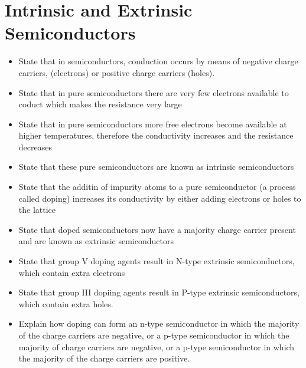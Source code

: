 \section{Intrinsic and Extrinsic Semiconductors}
\begin{multicols}{2}
	\begin{itemize}
        \item State that in semiconductors, conduction occurs by means of 
            negative charge carriers, (electrons) or positive charge carriers 
            (holes).
        \item State that in pure semiconductors there are very few electrons
            available to coduct which makes the resistance very large
        \item State that in pure semiconductors more free electrons become
            available at higher temperatures, therefore the conductivity
            increases and the resistance decreases
        \item State that these pure semiconductors are known as intrinsic
            semiconductors
        \item State that the additin of impurity atoms to a pure semiconductor
            (a process called doping) increases its conductivity by either
            adding electrons or holes to the lattice
        \item State that doped semiconductors now have a majority charge
            carrier present and are known as extrinsic semiconductors
        \item State that group V doping agents result in N-type extrinsic
            semiconductors, which contain extra electrons
        \item State that group III dopiing agents result in P-type extrinsic
            semiconductors, which contain extra holes.
        \item Explain how doping can form an n-type semiconductor in which the
            majority of the charge carriers are negative, or a p-type
            semiconductor in which the majority of charge carriers are
            negative, or a p-type semiconductor in which the majority of
            the charge carriers are positive.
	\end{itemize}
\end{multicols}

